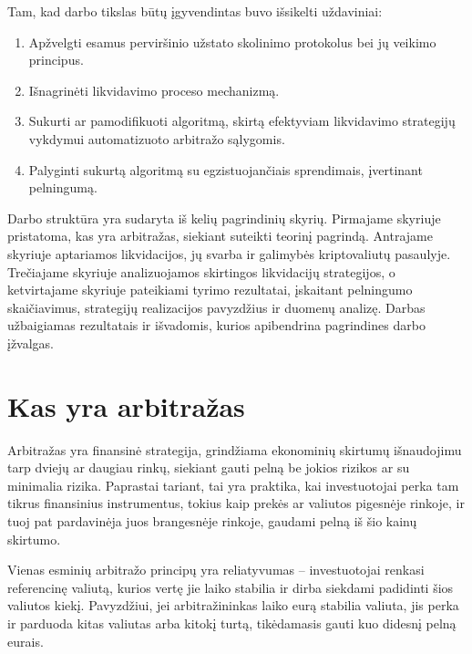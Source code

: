 \documentclass[]{VUMIFTemplateClass}
\begin{document}
Tam, kad darbo tikslas būtų įgyvendintas buvo išsikelti uždaviniai:
\begin{enumerate}
    \item Apžvelgti esamus perviršinio užstato skolinimo protokolus bei jų veikimo principus.
    \item Išnagrinėti likvidavimo proceso mechanizmą.
    \item Sukurti ar pamodifikuoti algoritmą, skirtą efektyviam likvidavimo strategijų vykdymui automatizuoto arbitražo sąlygomis.
    \item Palyginti sukurtą algoritmą su egzistuojančiais sprendimais, įvertinant pelningumą.
\end{enumerate}

Darbo struktūra yra sudaryta iš kelių pagrindinių skyrių. Pirmajame skyriuje pristatoma, kas yra arbitražas, siekiant suteikti teorinį pagrindą. Antrajame skyriuje aptariamos likvidacijos, jų svarba ir galimybės kriptovaliutų pasaulyje. Trečiajame skyriuje analizuojamos skirtingos likvidacijų strategijos, o ketvirtajame skyriuje pateikiami tyrimo rezultatai, įskaitant pelningumo skaičiavimus, strategijų realizacijos pavyzdžius ir duomenų analizę. Darbas užbaigiamas rezultatais ir išvadomis, kurios apibendrina pagrindines darbo įžvalgas.


\section{Kas yra arbitražas}
Arbitražas yra finansinė strategija, grindžiama ekonominių skirtumų išnaudojimu tarp dviejų ar daugiau rinkų, siekiant gauti pelną be jokios rizikos ar su minimalia rizika. Paprastai tariant, tai yra praktika, kai investuotojai perka tam tikrus finansinius instrumentus, tokius kaip prekės ar valiutos pigesnėje rinkoje, ir tuoj pat pardavinėja juos brangesnėje rinkoje, gaudami pelną iš šio kainų skirtumo.

Vienas esminių arbitražo principų yra reliatyvumas -- investuotojai renkasi referencinę valiutą, kurios vertę jie laiko stabilia ir dirba siekdami padidinti šios valiutos kiekį. Pavyzdžiui, jei arbitražininkas laiko eurą stabilia valiuta, jis perka ir parduoda kitas valiutas arba kitokį turtą, tikėdamasis gauti kuo didesnį pelną eurais.
\end{document}
